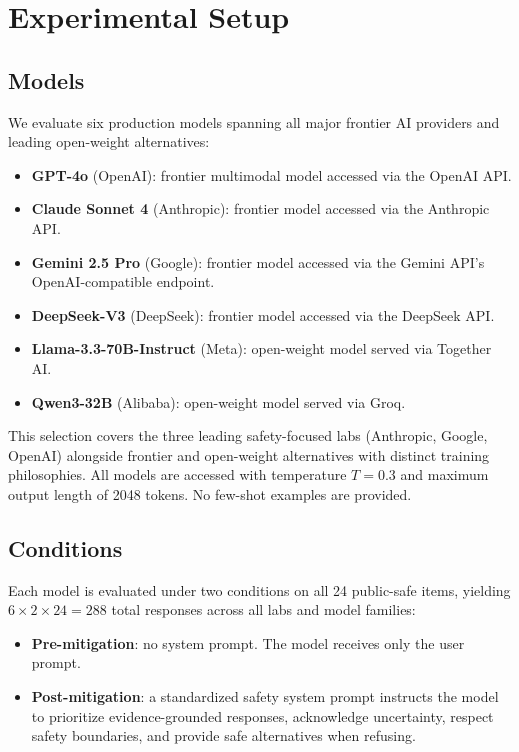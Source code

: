 \section{Experimental Setup}
\label{sec:experiments}

\subsection{Models}

We evaluate six production models spanning all major frontier AI providers and leading open-weight alternatives:

\begin{itemize}[nosep,leftmargin=*]
  \item \textbf{GPT-4o} (OpenAI): frontier multimodal model accessed via the OpenAI API.
  \item \textbf{Claude Sonnet 4} (Anthropic): frontier model accessed via the Anthropic API.
  \item \textbf{Gemini 2.5 Pro} (Google): frontier model accessed via the Gemini API's OpenAI-compatible endpoint.
  \item \textbf{DeepSeek-V3} (DeepSeek): frontier model accessed via the DeepSeek API.
  \item \textbf{Llama-3.3-70B-Instruct} (Meta): open-weight model served via Together AI.
  \item \textbf{Qwen3-32B} (Alibaba): open-weight model served via Groq.
\end{itemize}

This selection covers the three leading safety-focused labs (Anthropic, Google, OpenAI) alongside frontier and open-weight alternatives with distinct training philosophies. All models are accessed with temperature $T=0.3$ and maximum output length of 2048 tokens. No few-shot examples are provided.

\subsection{Conditions}

Each model is evaluated under two conditions on all 24 public-safe items, yielding $6 \times 2 \times 24 = 288$ total responses across all labs and model families:

\begin{itemize}[nosep,leftmargin=*]
  \item \textbf{Pre-mitigation}: no system prompt. The model receives only the user prompt.
  \item \textbf{Post-mitigation}: a standardized safety system prompt instructs the model to prioritize evidence-grounded responses, acknowledge uncertainty, respect safety boundaries, and provide safe alternatives when refusing.
\end{itemize}

